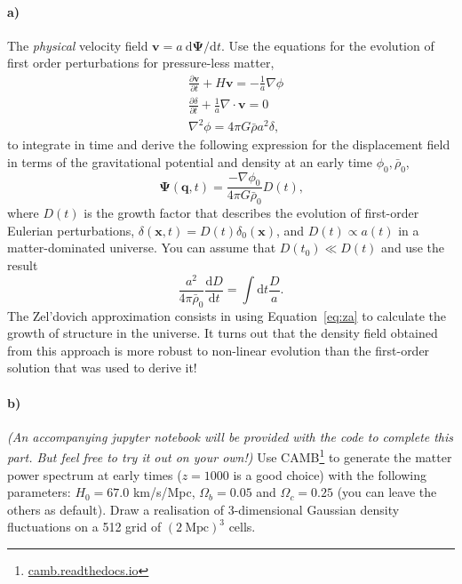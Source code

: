 \documentclass[12pt]{article}
\renewcommand\diff{\mathrm{d}}
\begin{document}
\paragraph{a)} The \emph{physical} velocity field $\mathbf{v} = a\: \diff\mathbf{\Psi}/\diff t$. Use
the equations for the evolution of first order perturbations for pressure-less
matter,
\begin{equation}
\begin{aligned}
    &\frac{\partial \mathbf{v}}{\partial t} + H \mathbf{v} = - \frac{1}{a} \nabla \phi \\
    &\frac{\partial \delta}{\partial t} + \frac{1}{a} \nabla \cdot \mathbf{v} = 0\\
    &\nabla^2 \phi = 4 \pi G \bar{\rho} a^2 \delta \text{,}
\end{aligned}
\label{eq:first-order}
\end{equation}
to integrate in time and derive the following expression for the displacement
field in terms of the gravitational potential and density at an early time
$\phi_0, \bar{\rho}_0$,
\begin{equation}
    \mathbf{\Psi}(\mathbf{q}, t) = \frac{-\nabla \phi_0}{4 \pi G \bar{\rho}_0} D(t)
    \text{,}
\label{eq:za}
\end{equation}
where $D(t)$ is the growth factor that describes the evolution of first-order
Eulerian perturbations, $\delta(\mathbf{x}, t) = D(t) \delta_0(\mathbf{x})$, and
$D(t) \propto a(t)$ in a matter-dominated universe. You can assume that $D(t_0)
\ll D(t)$ and use the result
\begin{equation}
    \frac{a^2}{4 \pi \bar{\rho}_0} \frac{\diff D}{\diff t} = \int \diff t \frac{D}{a} \text{.}
\end{equation}
The Zel'dovich approximation consists in using Equation~\ref{eq:za} to calculate
the growth of structure in the universe. It turns out that the density field
obtained from this approach is more robust to non-linear evolution than the
first-order solution that was used to derive it!

\paragraph{b)} \emph{(An accompanying jupyter notebook will be provided with the
code to complete this part. But feel free to try it out on your own!)} Use
CAMB\footnote{\url{camb.readthedocs.io}} to generate the matter power spectrum
at early times ($z=1000$ is a good choice) with the following parameters: $H_0 =
67.0$ km/s/Mpc, $\Omega_b = 0.05$ and $\Omega_c = 0.25$ (you can leave the
others as default). Draw a realisation of 3-dimensional Gaussian density
fluctuations on a 512 grid of $(2\:\mathrm{Mpc})^3$ cells.
\end{document}
